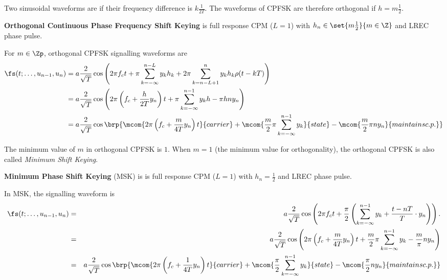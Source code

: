 Two sinusoidal waveforms are  if their frequency difference is 
$k\frac{1}{2T}$. 
The waveforms of CPFSK are therefore orthogonal if $h=m\frac{1}{2}$.
\begin{definition}
{\bf Orthogonal Continuous Phase Frequency Shift Keying}
is full response CPM ($L=1$) with $h_n\in\set{m\frac{1}{2}}{m\in\Z}$
and LREC phase pulse.
\end{definition}

For $m\in\Zp$, orthogonal CPFSK signalling waveforms are
\begin{align*}
   \fs(t;\ldots,u_{n-1},u_n)
     &= a \frac{2}{\sqrt{T}} 
          \cos\left(
             2\pi f_ct + 
             \pi \sum_{k=-\infty}^{n-L} y_k h_k  + 
             2\pi \sum_{k=n-L+1}^n y_k h_k \rho(t-kT)
          \right)
   \\&= a \frac{2}{\sqrt{T}} 
          \cos\left(
             2\pi \left(f_c +  \frac{h}{2T}y_n \right)t 
             + \pi \sum_{k=-\infty}^{n-1} y_k h  
             -\pi hn y_n  
          \right)
   \\&= a \frac{2}{\sqrt{T}} 
          \cos\brp{
            \mcom{2\pi \left(f_c +  \frac{m}{4T}y_n \right)t}{carrier} +
            \mcom{\frac{m}{2}\pi \sum_{k=-\infty}^{n-1} y_k }{state}  -
            \mcom{\frac{m}{2}\pi n y_n }{maintains c.p.}
            }
\end{align*}

The minimum value of $m$ in orthogonal CPFSK is $1$. 
When $m=1$ (the minimum value for orthogonality), 
the orthogonal CPFSK is also called {\em Minimum Shift Keying}.
\begin{definition}
{\bf Minimum Phase Shift Keying} (MSK) is 
is full response CPM ($L=1$) with $h_n=\frac{1}{2}$
and LREC phase pulse.
\end{definition}

In MSK, the signalling waveform is
\begin{eqnarray*}
   \fs(t;\ldots,u_{n-1},u_n)
     &=& a \frac{2}{\sqrt{T}} 
           \cos\left( 
              2\pi f_ct + 
              \frac{\pi}{2} \left( \sum_{k=-\infty}^{n-1} y_k  +
              \frac{t-nT}{T}\cdot y_n \right)
           \right).
   \\&=& a \frac{2}{\sqrt{T}} 
           \cos\left(
              2\pi \left(f_c +  \frac{m}{4T}y_n \right)t 
              + \frac{m}{2}\pi \sum_{k=-\infty}^{n-1} y_k   
              -\frac{m}{\pi} n y_n  
           \right)
   \\&=& a \frac{2}{\sqrt{T}} 
           \cos\brp{
              \mcom{2\pi \left(f_c +  \frac{1}{4T}y_n \right)t}{carrier} +
              \mcom{\frac{\pi}{2} \sum_{k=-\infty}^{n-1} y_k }{state}  -
              \mcom{\frac{\pi}{2} n y_n }{maintains c.p.}
           }
\end{eqnarray*}


